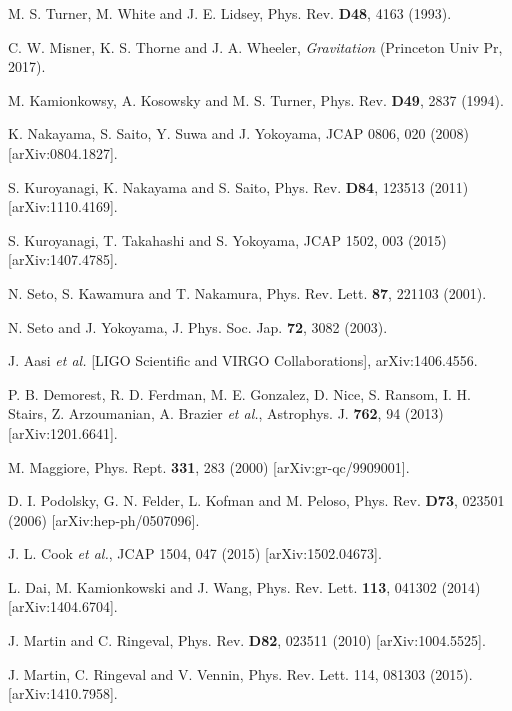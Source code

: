 \documentclass[11pt,a4paper,twoside]{book}
\begin{document}
\begin{thebibliography}{2}
	 M. S. Turner, M. White and J. E. Lidsey, Phys. Rev. \textbf{D48}, 4163 (1993).
	
	 C. W. Misner, K. S. Thorne and J. A. Wheeler, \textit{Gravitation} (Princeton Univ Pr, 2017).
	
	 M. Kamionkowsy, A. Kosowsky and M. S. Turner, Phys. Rev. \textbf{D49}, 2837 (1994).
	
	 K. Nakayama, S. Saito, Y. Suwa and J. Yokoyama, JCAP 0806, 020 (2008) [arXiv:0804.1827].
	
	 S. Kuroyanagi, K. Nakayama and S. Saito, Phys. Rev. \textbf{D84}, 123513 (2011) [arXiv:1110.4169].
	
	 S. Kuroyanagi, T. Takahashi and S. Yokoyama, JCAP 1502, 003 (2015) [arXiv:1407.4785]. 
	
	 N. Seto, S. Kawamura and T. Nakamura, Phys. Rev. Lett. \textbf{87}, 221103 (2001).
	
	 N. Seto and J. Yokoyama, J. Phys. Soc. Jap. \textbf{72}, 3082 (2003).
	
	 J. Aasi \textit{et al.} [LIGO Scientific and VIRGO Collaborations], arXiv:1406.4556.
	
	 P. B. Demorest, R. D. Ferdman, M. E. Gonzalez, D. Nice, S. Ransom, I. H. Stairs, Z. Arzoumanian, A. Brazier \textit{et al.}, Astrophys. J. \textbf{762}, 94 (2013) [arXiv:1201.6641].
		
	 M. Maggiore, Phys. Rept. \textbf{331}, 283 (2000) [arXiv:gr-qc/9909001].	
	
	 D. I. Podolsky, G. N. Felder, L. Kofman and M. Peloso, Phys. Rev. \textbf{D73}, 023501 (2006) [arXiv:hep-ph/0507096].
	
	 J. L. Cook \textit{et al.}, JCAP 1504, 047 (2015) [arXiv:1502.04673].
	
	 L. Dai, M. Kamionkowski and J. Wang, Phys. Rev. Lett. \textbf{113}, 041302 (2014) [arXiv:1404.6704].
	
	 J. Martin and C. Ringeval, Phys. Rev. \textbf{D82}, 023511 (2010) [arXiv:1004.5525].
	
	 J. Martin, C. Ringeval and V. Vennin, Phys. Rev. Lett. 114, 081303 (2015). [arXiv:1410.7958].
	

\end{thebibliography}
\end{document}
